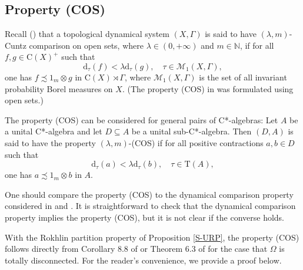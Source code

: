\documentclass[12pt, oneside, psamsfonts]{amsart}
\theoremstyle{definition}
\theoremstyle{remark}
\numberwithin{equation}{section}
\newcommand{\tr}{\mathrm{T}}
\begin{document}
\subsection{Property (COS)}
Recall (\cite{Niu-MD-Z}) that a topological  dynamical system $(X, \Gamma)$ is said to have $(\lambda, m)$-Cuntz comparison on open sets, where $\lambda \in (0, +\infty)$ and $m \in \mathbb N$, if for all $f, g \in \mathrm{C}(X)^+$ such that
$$\mathrm{d}_\tau(f) < \lambda \mathrm{d}_\tau(g), \quad \tau \in \mathcal M_1(X, \Gamma),$$
one has $f \precsim 1_m \otimes g $ in $\mathrm{C}(X) \rtimes \Gamma$, %
where $\mathcal M_1(X, \Gamma)$ is the set of all invariant probability Borel measures on $X$. (The property (COS) in \cite{Niu-MD-Z} was formulated using open sets.)


The property (COS) can be considered for general pairs of C*-algebras: Let $A$ be a unital C*-algebra and let $D \subseteq A$ be a unital sub-C*-algebra. Then $(D, A)$ is said to have the property $(\lambda, m)$-(COS) if for all positive contractions $a, b \in D$ such that
$$\mathrm{d}_\tau(a) < \lambda \mathrm{d}_\tau(b), \quad \tau \in \tr(A), $$
one has $a \precsim 1_m \otimes b $ in $A$. 

One should compare the property (COS) to the dynamical comparison property considered in \cite{KS-comparison} and \cite{DZ-comparison}. It is straightforward to check that the dynamical comparison property implies the property (COS), but it is not clear if the converse holds. 


With the Rokhlin partition property of Proposition \ref{S-URP}, the property (COS)  follows directly from Corollary 8.8 of \cite{Niu-MD-Z} or Theorem 6.3 of \cite{DZ-comparison} for the case that $\Omega$ is totally disconnected. For the reader's convenience, we provide a proof below.
\end{document}
